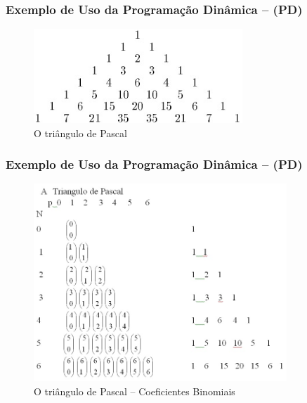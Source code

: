 \begin{frame}[fragile]

\frametitle{Exemplo de Uso da Programação Dinâmica -- (PD)}

\begin{figure}[!htb]
\centering
\includegraphics[width=0.70\textwidth, height=0.60\textheight]{figures/pascal_triangle_01.jpg}
\caption{O triângulo de Pascal}
\end{figure}
\end{frame}


\begin{frame}[fragile]

\frametitle{Exemplo de Uso da Programação Dinâmica -- (PD)}

\begin{figure}[!htb]
\centering
\includegraphics[width=0.850\textwidth, height=0.650\textheight]{figures/pascal_triangle_02.jpg}
\caption{O triângulo de Pascal -- Coeficientes Binomiais}
\end{figure}
    
\end{frame}

